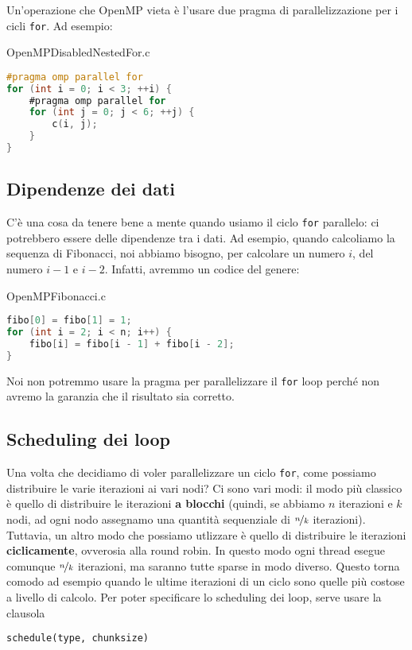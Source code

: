 Un'operazione che OpenMP vieta è l'usare due pragma di parallelizzazione per i cicli \verb|for|. Ad esempio:

\begin{codeblock}{OpenMPDisabledNestedFor.c}
    \begin{lstlisting}[language = C]
#pragma omp parallel for
for (int i = 0; i < 3; ++i) {
    #pragma omp parallel for
    for (int j = 0; j < 6; ++j) {
        c(i, j);
    }
}\end{lstlisting}
\end{codeblock}

\subsection{Dipendenze dei dati}

C'è una cosa da tenere bene a mente quando usiamo il ciclo \verb|for| parallelo: ci potrebbero essere delle dipendenze tra i dati. Ad esempio, quando calcoliamo la sequenza di Fibonacci, noi abbiamo bisogno, per calcolare un numero $i$, del numero $i - 1$ e $i - 2$. Infatti, avremmo un codice del genere:

\begin{codeblock}{OpenMPFibonacci.c}
    \begin{lstlisting}[language = C]
fibo[0] = fibo[1] = 1;
for (int i = 2; i < n; i++) {
    fibo[i] = fibo[i - 1] + fibo[i - 2];
}\end{lstlisting}
\end{codeblock}

Noi non potremmo usare la pragma per parallelizzare il \verb|for| loop perché non avremo la garanzia che il risultato sia corretto.


\subsection{Scheduling dei loop}

Una volta che decidiamo di voler parallelizzare un ciclo \verb|for|, come possiamo distribuire le varie iterazioni ai vari nodi? Ci sono vari modi: il modo più classico è quello di distribuire le iterazioni \textbf{a blocchi} (quindi, se abbiamo $n$ iterazioni e $k$ nodi, ad ogni nodo assegnamo una quantità sequenziale di $\nicefrac{n}{k}$ iterazioni). Tuttavia, un altro modo che possiamo utlizzare è quello di distribuire le iterazioni \textbf{ciclicamente}, ovverosia alla round robin. In questo modo ogni thread esegue comunque $\nicefrac{n}{k}$ iterazioni, ma saranno tutte sparse in modo diverso. Questo torna comodo ad esempio quando le ultime iterazioni di un ciclo sono quelle più costose a livello di calcolo.
\nl
Per poter specificare lo scheduling dei loop, serve usare la clausola 
\begin{center}
    \verb|schedule(type, chunksize)|
\end{center}

